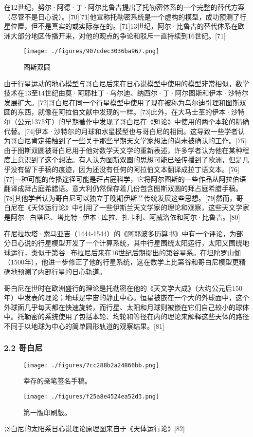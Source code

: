 在12世纪，努尔·阿德·丁·阿尔比鲁吉提出了托勒密体系的一个完整的替代方案（尽管不是日心说）。[70][71]他宣称托勒密系统是一个虚构的模型，成功预测了行星位置，但不是真实的或实际存在的。[71]13世纪，阿尔·比鲁吉的替代体系在欧洲大部分地区传播开来，对他的观点的争论和驳斥一直持续到16世纪。[71]
\begin{figure}[ht]
\centering
\texttt{[image: ./figures/907cdec3036ba967.png]}
\caption{图斯双圆} \label{fig_GBN_20}
\end{figure}
由于行星运动的地心模型与哥白尼后来在日心说模型中使用的模型非常相似，数学技术在13至14世纪由莫·阿耶杜丁·乌尔迪、纳西尔·丁·阿尔图斯和伊本·沙特尔发展扩大。[72]哥白尼在同一个行星模型中使用了现在被称为乌尔迪引理和图斯双圆的东西，就像在阿拉伯文献中发现的一样。[73]此外，在大马士革的伊本·沙特尔（公元1375年）的早期著作中发现了哥白尼在《短论》中使用的两个本轮的精确代替。[74]伊本·沙特尔的月球和水星模型也与哥白尼的相同。这导致一些学者认为哥白尼肯定接触到了一些关于那些早期天文学家想法的尚未被确认的工作。[75]由于图斯双圆被哥白尼用于他对数学天文学的重新表述，许多学者认为他在某种程度上意识到了这个想法。有人认为图斯双圆的思想可能已经传播到了欧洲，但是几乎没有留下手稿的痕迹，因为还没有任何的阿拉伯文本翻译成拉丁语文本。[76][77]一种可能的传播途径可能是拜占庭科学，它将阿尔图斯的一些作品从阿拉伯语翻译成拜占庭希腊语。意大利仍然保存着几份包含图斯双圆的拜占庭希腊手稿。[78]其他学者认为哥白尼可以独立于晚期伊斯兰传统发展这些思想。[79]然而，哥白尼在《天体运行论》中引用了一些伊斯兰天文学家的理论和观察，这些天文学家是阿尔·白塔尼、塔比特·伊本·库拉、扎卡利、阿威洛依和阿尔·比鲁吉。[80]

在尼拉坎塔·索马亚吉（1444-1544）的《阿耶波多历算书》中有一个评论，为部分日心说的行星模型开发了一个计算系统，其中行星围绕太阳运行，太阳又围绕地球运行，类似于第谷·布拉尼后来在16世纪后期提出的第谷星系。在坦陀罗山伽（1500年），他进一步修正了他的行星系统，这在数学上比第谷和哥白尼模型更精确地预测了内部行星的日心轨道。

哥白尼在世时在欧洲盛行的理论是托勒密在他的《天文学大成》（大约公元后150年）中发表的理论；地球是宇宙的静止中心。恒星被嵌在一个大的外球面中，这个外球面几乎每天都在快速旋转，而行星、太阳和月球则被嵌在它们自己较小的球体中。托勒密的系统使用了包括本轮、均轮和等径在内的理论来解释这些天体的路径不同于以地球为中心的简单圆形轨道的观察结果。[81]

\subsubsection{2.2 哥白尼}
\begin{figure}[ht]
\centering
\texttt{[image: ./figures/7cc288b2a24866bb.png]}
\caption{幸存的亲笔签名手稿。} \label{fig_GBN_21}
\end{figure}
\begin{figure}[ht]
\centering
\texttt{[image: ./figures/f25a8e4524ea52d3.png]}
\caption{第一版印刷版。} \label{fig_GBN_22}
\end{figure}
哥白尼的太阳系日心说理论原理图来自于《天体运行论》[82]

